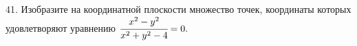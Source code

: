 41. Изобразите на координатной плоскости множество точек, координаты которых удовлетворяют уравнению $\cfrac{x^2-y^2}{x^2+y^2-4}=0.$\\
